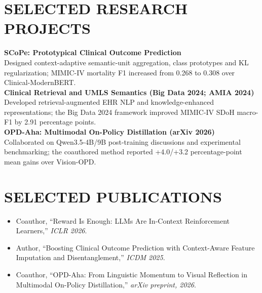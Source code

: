 \documentclass[10pt, letterpaper]{article}
\begin{document}
\section{SELECTED RESEARCH PROJECTS}
\textbf{SCoPe: Prototypical Clinical Outcome Prediction}\\[-1pt]
Designed context-adaptive semantic-unit aggregation, class prototypes and KL regularization; MIMIC-IV mortality F1 increased from 0.268 to 0.308 over Clinical-ModernBERT.\\[3pt]
\textbf{Clinical Retrieval and UMLS Semantics (Big Data 2024; AMIA 2024)}\\[-1pt]
Developed retrieval-augmented EHR NLP and knowledge-enhanced representations; the Big Data 2024 framework improved MIMIC-IV SDoH macro-F1 by 2.91 percentage points.\\[3pt]
\textbf{OPD-Aha: Multimodal On-Policy Distillation (arXiv 2026)}\\[-1pt]
Collaborated on Qwen3.5-4B/9B post-training discussions and experimental benchmarking; the coauthored method reported +4.0/+3.2 percentage-point mean gains over Vision-OPD.\\[3pt]
\section{SELECTED PUBLICATIONS}
\begin{itemize}
\item Coauthor, ``Reward Is Enough: LLMs Are In-Context Reinforcement Learners,'' \textit{ICLR 2026}.
\item Author, ``Boosting Clinical Outcome Prediction with Context-Aware Feature Imputation and Disentanglement,'' \textit{ICDM 2025}.
\item Coauthor, ``OPD-Aha: From Linguistic Momentum to Visual Reflection in Multimodal On-Policy Distillation,'' \textit{arXiv preprint, 2026}.
\end{itemize}
\end{document}
